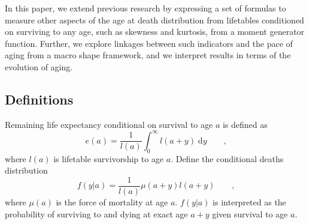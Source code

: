 \documentclass{article}
\newcommand{\dd}{\; \mathrm{d}}
\newcommand{\tc}{\quad\quad\text{,}}
\begin{document}
In this paper, we extend previous research by expressing a set of formulas to
measure other aspects of the age at death distribution from lifetables
conditioned on surviving to any age, such as skewness and kurtosis, from a
moment generator function. Further, we explore linkages between such indicators
and the pace of aging from a macro shape framework, and we interpret results
in terms of the evolution of aging.

\subsection*{Definitions}

Remaining life expectancy conditional on survival to age $a$ is defined as
\begin{equation}
e(a) = \frac{1}{l(a)}\int_0^\infty l(a+y) \dd y \tc
\end{equation}
where $l(a)$ is lifetable survivorship to age $a$.
Define the
conditional deaths distribution
\begin{equation}
\label{eq:fya}
f(y|a) = \frac{1}{l(a)} \mu(a+y) l(a+y) \tc
\end{equation}
where $\mu(a)$ is the force of mortality at age $a$. $f(y|a)$ is interpreted as
the probability of surviving to and dying at exact age $a+y$ given survival to
age $a$.
\end{document}
